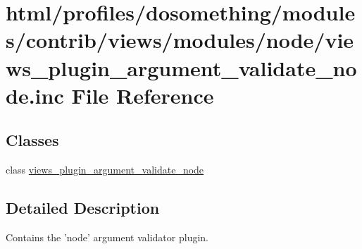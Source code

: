\hypertarget{views__plugin__argument__validate__node_8inc}{
\section{html/profiles/dosomething/modules/contrib/views/modules/node/views\_\-plugin\_\-argument\_\-validate\_\-node.inc File Reference}
\label{views__plugin__argument__validate__node_8inc}
}
\subsection*{Classes}
\begin{DoxyCompactItemize}
\item 
class \hyperlink{classviews__plugin__argument__validate__node}{views\_\-plugin\_\-argument\_\-validate\_\-node}
\end{DoxyCompactItemize}


\subsection{Detailed Description}
Contains the 'node' argument validator plugin. 